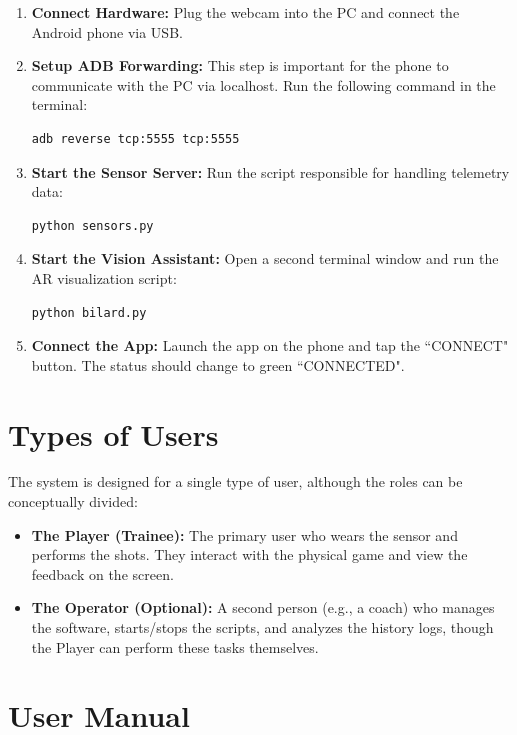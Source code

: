 \begin{enumerate}
    \item \textbf{Connect Hardware:} Plug the webcam into the PC and connect the Android phone via USB.
    \item \textbf{Setup ADB Forwarding:} This step is important for the phone to communicate with the PC via localhost. Run the following command in the terminal:
    \begin{lstlisting}[language=bash]
    adb reverse tcp:5555 tcp:5555
    \end{lstlisting}
    \item \textbf{Start the Sensor Server:} Run the script responsible for handling telemetry data:
    \begin{lstlisting}[language=bash]
    python sensors.py
    \end{lstlisting}
    \item \textbf{Start the Vision Assistant:} Open a second terminal window and run the AR visualization script:
    \begin{lstlisting}[language=bash]
    python bilard.py
    \end{lstlisting}
    \item \textbf{Connect the App:} Launch the app on the phone and tap the ``CONNECT" button. The status should change to green ``CONNECTED".
\end{enumerate}

\section{Types of Users}

The system is designed for a single type of user, although the roles can be conceptually divided:
\begin{itemize}
    \item \textbf{The Player (Trainee):} The primary user who wears the sensor and performs the shots. They interact with the physical game and view the feedback on the screen.
    \item \textbf{The Operator (Optional):} A second person (e.g., a coach) who manages the software, starts/stops the scripts, and analyzes the history logs, though the Player can perform these tasks themselves.
\end{itemize}

\section{User Manual}

